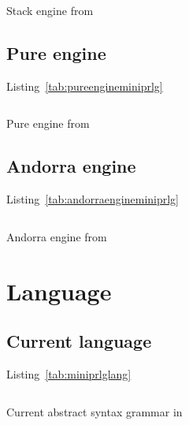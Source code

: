 \documentclass[thesis-solanki.tex]{files}
\begin{document}
\begin{code-list}[H]
\begin{singlespace}
\inputminted[linenos, firstline=29, lastline=62]{haskell}{haskell-proto3-sudsy-woe.hs}
\end{singlespace}
\caption{Stack engine from \cite{website:mini-prolog-hugs98}}
\label{tab:stackengineminiprlg}
\end{code-list}

\subsection{Pure engine}
Listing~\ref{tab:pureengineminiprlg}

\begin{code-list}[H]
\begin{singlespace}
\inputminted[linenos, firstline=26, lastline=46]{haskell}{haskell-proto3-absurd-silicon.hs}
\end{singlespace}
\caption{Pure engine from \cite{website:mini-prolog-hugs98}}
\label{tab:pureengineminiprlg}
\end{code-list}

\subsection{Andorra engine}
Listing~\ref{tab:andorraengineminiprlg}

\begin{code-list}[H]
\begin{singlespace}
\inputminted[linenos, firstline=29, lastline=64]{haskell}{haskell-proto3-diatomic-unbank.hs}
\end{singlespace}
\caption{Andorra engine from \cite{website:mini-prolog-hugs98}}
\label{tab:andorraengineminiprlg}
\end{code-list}


\section{Language}
\subsection{Current language}
Listing~\ref{tab:miniprlglang}
\begin{code-list}[H]
\begin{singlespace}
  \inputminted[linenos, firstline=24, lastline=37]{haskell}{haskell-proto3-butter-chicken.hs}
\end{singlespace}
\caption{Current abstract syntax grammar in \cite{website:mini-prolog-hugs98}}
\label{tab:miniprlglang}
\end{code-list}
\end{document}
